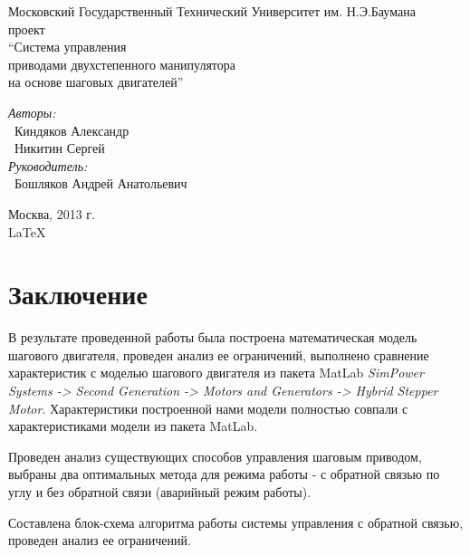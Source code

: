 \documentclass{article}
\begin{document}
\begin{titlepage}
\begin{center}
    {\large Московский Государственный Технический Университет им. Н.Э.Баумана}
    \\[50mm]
    { проект}
    \\[7mm]
    {\LARGE ``Система управления \\ приводами двухстепенного манипулятора \\ на основе шаговых двигателей''}
    \\[37mm]

    \begin{flushright}
        \begin{minipage}{0.5\textwidth}
            \begin{flushleft}
                \textit{Авторы:} \\
                ~Киндяков Александр \\
                ~Никитин Сергей \\[10mm]
                \textit{Руководитель:} \\
                ~Бошляков Андрей Анатольевич
            \end{flushleft}
        \end{minipage}
    \end{flushright}

    \vfill %
    Москва, 2013 г. \\
    \LaTeX
\end{center}
\end{titlepage}

\tableofcontents
\newpage






\newpage

\section{Заключение}

В результате проведенной работы была построена математическая модель шагового двигателя, проведен
анализ ее ограничений, выполнено сравнение характеристик с моделью шагового двигателя из пакета MatLab
\textit{SimPower Systems -> Second Generation -> Motors and Generators -> Hybrid Stepper Motor}.
Характеристики построенной нами модели полностью совпали с характеристиками модели из пакета MatLab.

Проведен анализ существующих способов управления шаговым приводом, выбраны два оптимальных метода для
режима работы - с обратной связью по углу и без обратной связи (аварийный режим работы).

Составлена блок-схема алгоритма работы системы управления с обратной связью, проведен анализ ее
ограничений.


\end{document}
